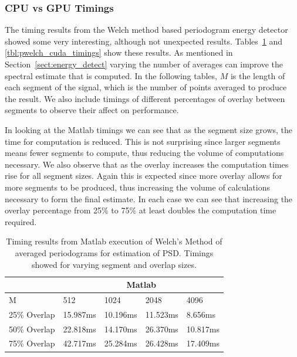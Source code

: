 \subsubsection{CPU vs GPU Timings}
The timing results from the Welch method based periodogram energy detector showed some very interesting, although not unexpected results.  Tables~\ref{tbl:pwelch_matlab_timings} and \ref{tbl:pwelch_cuda_timings} show these results.  As mentioned in Section~\ref{sect:energy_detect} varying the number of averages can improve the spectral estimate that is computed.  In the following tables, $M$ is the length of each segment of the signal, which is the number of points averaged to produce the result.  We also include timings of different percentages of overlay between segments to observe their affect on performance.

In looking at the Matlab timings we can see that as the segment size grows, the time for computation is reduced.  This is not surprising since larger segments means fewer segments to compute, thus reducing the volume of computations necessary.  We also observe that as the overlay increases the computation times rise for all segment sizes.  Again this is expected since more overlay allows for more segments to be produced, thus increasing the volume of calculations necessary to form the final estimate.  In each case we can see that increasing the overlay percentage from 25\% to 75\% at least doubles the computation time required.
 
\begin{table}
\begin{center}
\begin{tabular}{|l|l|l|l|l|}
\hline
 & \multicolumn{4}{|c|}{Matlab} \\
\hline
M & 512 & 1024 & 2048 & 4096 \\
\hline
25\% Overlap & 15.987ms & 10.196ms & 11.523ms & 8.656ms \\
50\% Overlap & 22.818ms & 14.170ms & 26.370ms & 10.817ms \\
75\% Overlap & 42.717ms & 25.284ms & 26.428ms & 17.409ms \\
\hline
\end{tabular}
\vspace{0.5cm}
\caption{Timing results from Matlab execution of Welch's Method of averaged periodograms for estimation of PSD.  Timings showed for varying segment and overlap sizes.}
\label{tbl:pwelch_matlab_timings}
\end{center}
\end{table}

